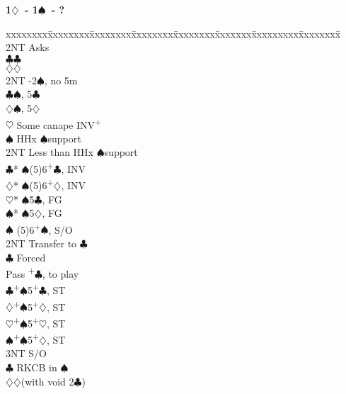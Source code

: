 \documentclass[10pt]{article}
\renewcommand{\c}{$\clubsuit$}
\renewcommand{\d}{$\diamondsuit$}
\newcommand{\h}{$\heartsuit$}
\newcommand{\s}{$\spadesuit$}
\newcommand{\p}{\textsuperscript{+}}
\newenvironment{bidtable}[1][]
{\textbf{#1}
  \begin{adjustwidth}{1em}{}
    \addvspace{2pt}
    \begin{tabbing}
      xxxxxxxx\=xxxxxxxx\=xxxxxxxx\=xxxxxxxx\=xxxxxxxx\=xxxxxxx\=xxxxxxxxx\=xxxxxxxx\=\kill}
{\end{tabbing}\end{adjustwidth}\bigskip}%
\begin{document}
\begin{bidtable}[1\d\ - 1\s\ - ?]
     \>      \>     \> 2NT  \> Asks                                \\
     \>      \>     \>      \c {}\c                          \\
     \>      \>     \>      \d {}\d                          \\
     \>      \> 2NT -2\s, no 5m                                \\
     \>      \c {}\s, 5\c                                    \\
     \>      \d {}\s, 5\d                                    \\
     \h  \> Some canape INV\p                                  \\
     \>      \s \> HHx \s support                              \\
     \>      \> 2NT \> Less than HHx \s support                    \\
     \>      \>     \c* {}\s (5)6\p\c, INV                   \\
     \>      \>     \d* {}\s (5)6\p\d, INV                   \\
     \>      \>     \h* {}\s 5\c, FG                         \\
     \>      \>     \s* {}\s 5\d, FG                         \\
     \s  \> (5)6\p\s, S/O                                      \\
     \> 2NT  \> Transfer to \c                                     \\
     \>      \c \> Forced                                      \\
     \>      \>     \> Pass \p\c, to play                      \\
     \c  {}\p\s 5\p\c, ST                                    \\
     \d  {}\p\s 5\p\d, ST                                    \\
     \h  {}\p\s 5\p\h, ST                                    \\
     \s  {}\p\s 5\p\d, ST                                    \\
     \> 3NT  \> S/O                                                \\
     \c  \> RKCB in \s                                         \\
     \d  {}\d (with void 2\c)                                \\

\end{bidtable}
\end{document}
